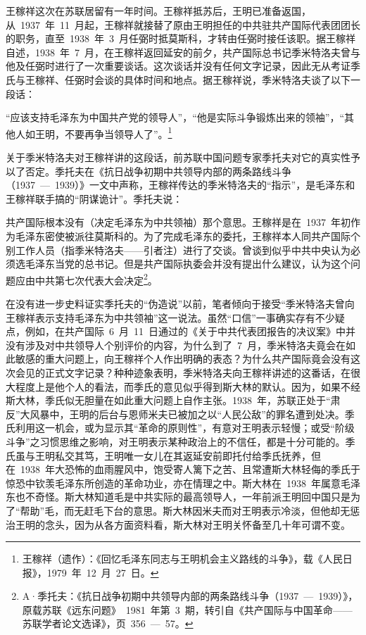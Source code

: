 王稼祥这次在苏联居留有一年时间。王稼祥抵苏后，王明已准备返国，从~1937~年~11~月起，王稼祥就接替了原由王明担任的中共驻共产国际代表团团长的职务，直至~1938~年~3~月任弼时抵莫斯科，才转由任弼时接任该职。据王稼祥自述，1938~年~7~月，在王稼祥返回延安的前夕，共产国际总书记季米特洛夫曾与他及任弼时进行了一次重要谈话。这次谈话并没有任何文字记录，因此无从考证季氏与王稼祥、任弼时会谈的具体时间和地点。据王稼祥说，季米特洛夫谈了以下一段话：

\begin{quoting}
“应该支持毛泽东为中国共产党的领导人”，“他是实际斗争锻炼出来的领袖”，“其他人如王明，不要再争当领导人了”。\footnote{王稼祥（遗作）：《回忆毛泽东同志与王明机会主义路线的斗争》，载《人民日报》，1979~年~12~月~27~日。}
\end{quoting}

关于季米特洛夫对王稼祥讲的这段话，前苏联中国问题专家季托夫对它的真实性予以了否定。季托夫在《抗日战争初期中共领导内部的两条路线斗争（1937~—~1939）》一文中声称，王稼祥传达的季米特洛夫的“指示”，是毛泽东和王稼祥联手搞的“阴谋诡计”。季托夫说：

\begin{quoting}
共产国际根本没有（决定毛泽东为中共领袖）那个意思。王稼祥是在~1937~年初作为毛泽东密使被派往莫斯科的。为了完成毛泽东的委托，王稼祥本人同共产国际个别工作人员（指季米特洛夫——引者注）进行了交谈。曾谈到似乎中共中央认为必须选毛泽东当党的总书记。但是共产国际执委会并没有提出什么建议，认为这个问题应由中共第七次代表大会决定\footnote{A·季托夫：《抗日战争初期中共领导内部的两条路线斗争（1937~—~1939）》，原载苏联《远东问题》~1981~年第~3~期，转引自《共产国际与中国革命——苏联学者论文选译》，页~356~—~57。}。
\end{quoting}

在没有进一步史料证实季托夫的“伪造说”以前，笔者倾向于接受“季米特洛夫曾向王稼祥表示支持毛泽东为中共领袖”这一说法。虽然“口信”一事确实存有不少疑点，例如，在共产国际~6~月~11~日通过的《关于中共代表团报告的决议案》中并没有涉及对中共领导人个别评价的内容，为什么到了~7~月，季米特洛夫竟会在如此敏感的重大问题上，向王稼祥个人作出明确的表态？为什么共产国际竟会没有这次会见的正式文字记录？种种迹象表明，季米特洛夫向王稼祥讲述的这番话，在很大程度上是他个人的看法，而季氏的意见似乎得到斯大林的默认。因为，如果不经斯大林，季氏似无胆量在如此重大问题上自作主张。1938~年，苏联正处于“肃反”大风暴中，王明的后台与恩师米夫已被加之以“人民公敌”的罪名遭到处决。季氏利用这一机会，或为显示其“革命的原则性”，有意对王明表示轻慢；或受“阶级斗争”之习惯思维之影响，对王明表示某种政治上的不信任，都是十分可能的。季氏虽与王明私交其笃，王明唯一女儿在其返延安前即托付给季氏抚养，但在~1938~年大恐怖的血雨腥风中，饱受寄人篱下之苦、且常遭斯大林轻侮的季氏于惊恐中钦羡毛泽东所创造的革命功业，亦在情理之中。斯大林在~1938~年属意毛泽东也不奇怪。斯大林知道毛是中共实际的最高领导人，一年前派王明回中国只是为了“帮助”毛，而无赶毛下台的意思。斯大林因米夫而对王明表示冷淡，但他却无惩治王明的念头，因为从各方面资料看，斯大林对王明关怀备至几十年可谓不变。


